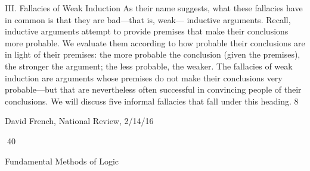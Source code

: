 
III. Fallacies of Weak Induction
As their name suggests, what these fallacies have in common is that they are bad—that is, weak—
inductive arguments. Recall, inductive arguments attempt to provide premises that make their
conclusions more probable. We evaluate them according to how probable their conclusions are in
light of their premises: the more probable the conclusion (given the premises), the stronger the
argument; the less probable, the weaker. The fallacies of weak induction are arguments whose
premises do not make their conclusions very probable—but that are nevertheless often successful
in convincing people of their conclusions. We will discuss five informal fallacies that fall under
this heading.
8

David French, National Review, 2/14/16

40

Fundamental Methods of Logic


